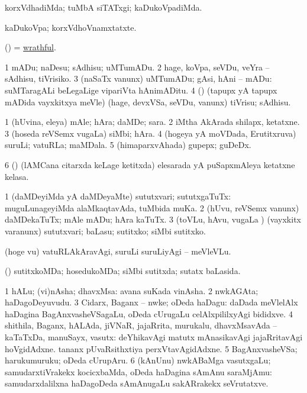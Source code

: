 \bentry
{} 
\gl{\kirxvi}
\expl{}
\bmng
korxVdhadiMda; tuMbA siTATxgi; kaDukoVpadiMda. 
\emng
\eentry

\bentry
{} 
\gl{\nA}
\expl{}
\bmng
kaDukoVpa; korxVdhoVnamxtatxte. 
\emng
\eentry

\bentry
{} 
\gl{\gu}
\expl{}
\bmng
(\ame) = \hyperlink{wrathful}{wrathful}. 
\emng
\eentry

\bentry
{} 
\gl{\sakirx}
\expl{}
\bmng
\bnum
\num{1} mADu; naDesu; sAdhisu; uMTumADu. 
\num{2} hage, koVpa, seVDu, veYra -- sAdhisu, tiVrisiko. 
\num{3} (naSaTx \mo vanunx) uMTumADu; gAsi, hAni -- mADu:  suMTaragALi beLegaLige vipariVta hAnimADitu. 
\num{4} (\pArxparx) (tapupx yA tapupx mADida vayxkitxya meVle) (hage, devxVSa, seVDu, \mo vanunx) tiVrisu; sAdhisu. 
\enum
\emng
\eentry

\bentry
{} 
\gl{\nA}
\bmng
\bnum
\num{1} (hUvina, eleya) mAle; hAra; daMDe; sara. 
\num{2} iMtha AkArada shilapx, ketatxne. 
\num{3} (hoseda reVSemx \mo vugaLa) siMbi; hAra. 
\num{4} (hogeya yA moVDada, Erutitxruva) suruLi; vatuRLa; maMDala. 
\num{5} (himaparxvAhada) gupepx; guDeDx. 
\num{6} (\vaMlAM) (lAMCana citarxda keLage ketitxda) elesarada yA puSapxmAleya ketatxne kelasa. 
\enum
\emng
\eentry

\bentry 
{} 
\gl{\sakirx}
\expl{}
\bmng
\bnum
\num{1} (daMDeyiMda yA daMDeyaMte) sututxvari; sututxgaTuTx:  muguLunageyiMda alaMkaqtavAda, tuMbida muKa. 
\num{2} (hUvu, reVSemx \mo vanunx) daMDekaTuTx; mAle mADu; hAra kaTuTx. 
\num{3} (toVLu, hAvu, \mo vugaLa \vi) (vayxkitx \mo varanunx) sututxvari; baLasu; sutitxko; siMbi sutitxko. 
\enum
\emng

\noindent
\gl{\akirx}
\expl{}
\bmng
(hoge \mo vu) vatuRLAkAravAgi, suruLi suruLiyAgi -- meVleVLu. 
\emng
\eentry

\bentry
{} 
\gl{\gu}
\expl{}
\bmng
(\pArxparx) sutitxkoMDa; hosedukoMDa; siMbi sutitxda; sutatx baLasida. 
\emng
\eentry

\bentry
{} 
\gl{\nA}
\expl{}
\bmng
\bnum
\num{1} hALu; (vi)nAsha; dhavxMsa:  avana suKada vinAsha. 
\num{2} nwkAGAta; haDagoDeyuvudu. 
\num{3} Cidarx, Baganx -- nwke; oDeda haDagu:  daDada meVlelAlx haDagina BagAnxvasheVSagaLu, oDeda cUrugaLu celAlxpililxyAgi bididxve. 
\num{4} shithila, Baganx, hALAda, jiVNaR, jajaRrita, murukalu, dhavxMsavAda -- kaTaTxDa, manuSayx, vasutx:  deYhikavAgi matutx mAnasikavAgi jajaRritavAgi hoVgidAdxne.  tananx pUvaRsithxtiya perxVtavAgidAdxne. 
\num{5} BagAnxvasheVSa; harukumuruku; oDeda cUrupAru. 
\num{6} (kAnUnu) nwkABaMga vasutxgaLu; samudarxtiVrakekx kocicxbaMda, oDeda haDagina sAmAnu saraMjAmu:  samudarxdalilxna haDagoDeda sAmAnugaLu sakARrakekx seVrutatxve. 
\enum
\emng
\eentry

